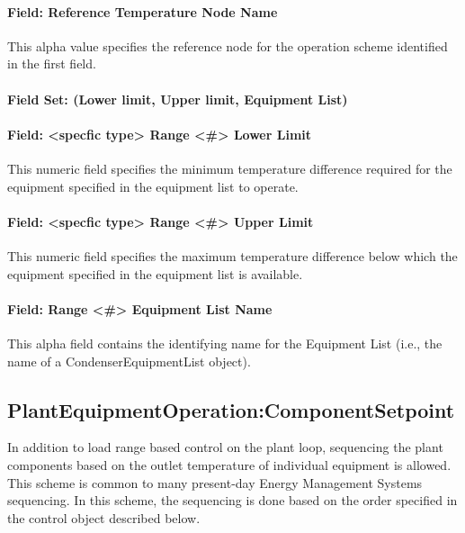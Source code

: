 \paragraph{Field: Reference Temperature Node Name}\label{field-reference-temperature-node-name}

This alpha value specifies the reference node for the operation scheme identified in the first field.

\paragraph{Field Set: (Lower limit, Upper limit, Equipment List)}\label{field-set-lower-limit-upper-limit-equipment-list}

\paragraph{Field: \textless{}specfic type\textgreater{} Range \textless{}\#\textgreater{} Lower Limit}\label{field-specfic-type-range-lower-limit-1}

This numeric field specifies the minimum temperature difference required for the equipment specified in the equipment list to operate.

\paragraph{Field: \textless{}specfic type\textgreater{} Range \textless{}\#\textgreater{} Upper Limit}\label{field-specfic-type-range-upper-limit}

This numeric field specifies the maximum temperature difference below which the equipment specified in the equipment list is available.

\paragraph{Field: Range \textless{}\#\textgreater{} Equipment List Name}\label{field-range-equipment-list-name-2}

This alpha field contains the identifying name for the Equipment List (i.e., the name of a CondenserEquipmentList object).

\subsection{PlantEquipmentOperation:ComponentSetpoint}\label{plantequipmentoperationcomponentsetpoint}

In addition to load range based control on the plant loop, sequencing the plant components based on the outlet temperature of individual equipment is allowed. This scheme is common to many present-day Energy Management Systems sequencing. In this scheme, the sequencing is done based on the order specified in the control object described below.

